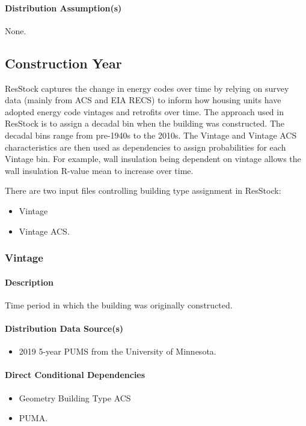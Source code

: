 \paragraph{Distribution Assumption(s)}
None.

\subsection{Construction Year}
ResStock captures the change in energy codes over time by relying on survey data (mainly from ACS and EIA RECS) to inform how housing units have adopted energy code vintages and retrofits over time. The approach used in ResStock is to assign a decadal bin when the building was constructed. The decadal bins range from pre-1940s to the 2010s. The Vintage and Vintage ACS characteristics are then used as dependencies to assign probabilities for each Vintage bin. For example, wall insulation being dependent on vintage allows the wall insulation R-value mean to increase over time.

There are two input files controlling building type assignment in ResStock:

\begin{itemize}
    \item Vintage
    \item Vintage ACS.
\end{itemize}

\subsubsection{Vintage}
\paragraph{Description}
Time period in which the building was originally constructed.

\paragraph{Distribution Data Source(s)}
\begin{itemize}
    \item 2019 5-year PUMS from the University of Minnesota.
\end{itemize}

\paragraph{Direct Conditional Dependencies}
\begin{itemize}
    \item Geometry Building Type ACS
    \item PUMA.
\end{itemize}

